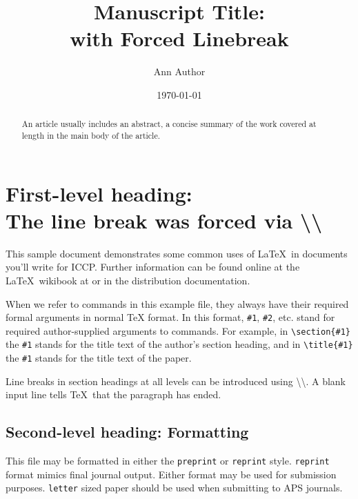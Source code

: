 \documentclass[]{article}
\begin{document}
 

\title{Manuscript Title:\\with Forced Linebreak}%

\author{Ann Author}


\date{\today}%

\maketitle

\begin{abstract}
An article usually includes an abstract, a concise summary of the work
covered at length in the main body of the article. 
\end{abstract}

\section{\label{sec:level1}First-level heading:\protect\\ The line
break was forced \lowercase{via} \textbackslash\textbackslash}

This sample document demonstrates some common uses of \LaTeX\ in documents you'll write for ICCP. Further information can be found online at the 
\LaTeX\ wikibook at  or in the distribution documentation. 

When we refer to commands in this example file, they always
have their required formal arguments in normal \TeX{} format. In
this format, \verb+#1+, \verb+#2+, etc. stand for required
author-supplied arguments to commands. For example, in
\verb+\section{#1}+ the \verb+#1+ stands for the title text of the
author's section heading, and in \verb+\title{#1}+ the \verb+#1+
stands for the title text of the paper.

Line breaks in section headings at all levels can be introduced using
\textbackslash\textbackslash. A blank input line tells \TeX\ that the
paragraph has ended. 
\subsection{\label{sec:level2}Second-level heading: Formatting}

This file may be formatted in either the \texttt{preprint} or
\texttt{reprint} style. \texttt{reprint} format mimics final journal output. 
Either format may be used for submission purposes. \texttt{letter} sized paper should
be used when submitting to APS journals. 
\end{document}
